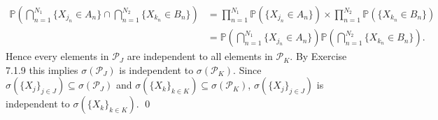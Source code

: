 \begin{answer}
\begin{equation*}
\begin{aligned}
                \mathbb{P}\left(\bigcap_{n=1}^{N_1}\{X_{j_n}\in A_n\}\cap\bigcap_{n=1}^{N_2}\{X_{k_n}\in B_n\}\right)&=\prod_{n=1}^{N_1}\mathbb{P}(\{X_{j_n}\in A_n\})\times\prod_{n=1}^{N_2}\mathbb{P}(\{X_{k_n}\in B_n\}) \\
                &=\mathbb{P}\left(\bigcap_{n=1}^{N_1}\{X_{j_n}\in A_n\}\right)\mathbb{P}\left(\bigcap_{n=1}^{N_2}\{X_{k_n}\in B_n\}\right).
        \end{aligned}
    \end{equation*}
    Hence every elements in $\mathcal{P}_J$ are independent to all elements in $\mathcal{P}_K$. By Exercise 7.1.9 this implies $\sigma(\mathcal{P}_J)$ is independent to $\sigma(\mathcal{P}_K)$. Since $\sigma(\{X_j\}_{j\in J})\subseteq\sigma(\mathcal{P}_J)$ and $\sigma(\{X_k\}_{k\in K})\subseteq\sigma(\mathcal{P}_K)$, $\sigma(\{X_j\}_{j\in J})$ is independent to $\sigma(\{X_k\}_{k\in K})$. \qquad \qed
\end{answer}

